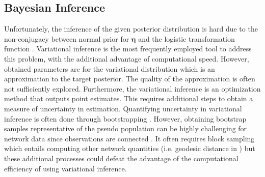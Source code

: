 \subsection{Bayesian Inference}
\label{sec:inference}
Unfortunately, the inference of the given posterior distribution is hard due to the non-conjugacy between normal prior for $\pmb\eta$ and the logistic transformation function \citep{blei2007correlated}. Variational inference is the most frequently employed tool to address this problem, with the additional advantage of computational speed. However, obtained parameters are for the variational distribution which is an approximation to the target posterior. The quality of the approximation is often not sufficiently explored. Furthermore, the variational inference is an optimization method that outputs point estimates. This requires additional steps to obtain a measure of uncertainty in estimation. Quantifying uncertainty in variational inference is often done through bootstrapping \citep{chen2018use,imai2016fast}. However, obtaining bootstrap samples representative of the pseudo population can be highly challenging for network data since observations are connected \citep{chen2019snowboot,levin2019bootstrapping}. It often requires block sampling which entails computing other network quantities (i.e. geodesic distance in \cite{raftery2012fast}) but these additional processes could defeat the advantage of the computational efficiency of using variational inference. 

